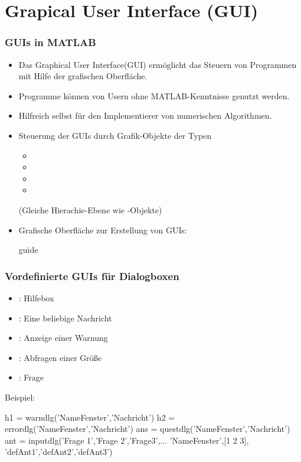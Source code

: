
%
%
%
%
\section{Grapical User Interface (GUI)}
%
%
\begin{frame}[fragile]\frametitle{GUIs in MATLAB}
\begin{itemize}
\item Das Graphical User Interface(GUI) erm\"oglicht das Steuern von Programmen
  mit Hilfe der grafischen Oberfl\"ache. 
\item Programme können von Usern ohne MATLAB-Kenntnisse genutzt werden. 
\item Hilfreich selbst für den Implementierer von numerischen Algorithmen.
\item Steuerung der GUIs durch Grafik-Objekte der Typen
\begin{itemize}
\item {}
\item {} 
\item {}
\item {}
\end{itemize}
(Gleiche Hierachie-Ebene wie -Objekte)
\item Grafische Oberfl\"ache zur Erstellung von GUIs:
\begin{matlabin}
guide
\end{matlabin}
 
\end{itemize}
\end{frame}
%
%
\begin{frame}[fragile]\frametitle{Vordefinierte GUIs f\"ur Dialogboxen}
\begin{itemize}
\item { }: Hilfebox
\item { }: Eine beliebige Nachricht
\item { }: Anzeige einer Warnung
\item { }: Abfragen einer Gr\"o{\ss}e
\item { }: Frage
\end{itemize}
\alert{Beispiel:}
\begin{matlabin}
h1 = warndlg('NameFenster','Nachricht')
h2 = errordlg('NameFenster','Nachricht')
ans = questdlg('NameFenster','Nachricht')
ant = inputdlg({'Frage 1','Frage 2','Frage3'},...
  'NameFenster',[1 2 3], {'defAnt1','defAnt2','defAnt3'})
\end{matlabin}
\end{frame}
